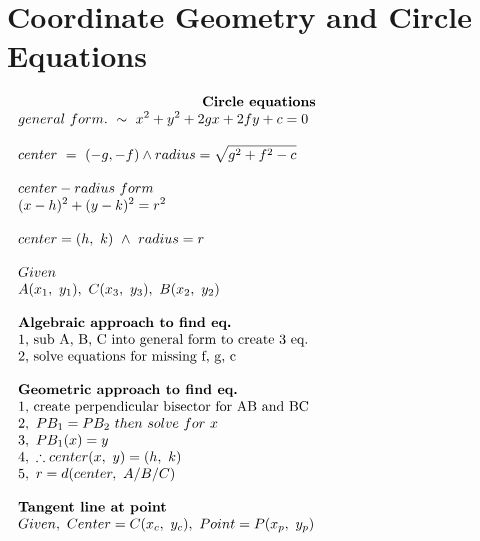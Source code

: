 \documentclass{article}
\begin{document}
\newpage 

\section{Coordinate Geometry and Circle Equations}

\setlength{\columnsep}{3cm}
\begin{multicols}{2}
    \noindent 
    \[
        \\
        \\
    \begin{array}{>{\displaystyle}l}
        \centerline{$\textbf{Circle\ equations}$}\\
        general\ form.\ \sim \ x^{2} +y^{2} +2gx+2fy+c=0\\
        \\
        center\ =\ ( -g,-f) \land radius=\sqrt{g^{2} +f^{2} -c} \ \\
        \\
        center-radius\ form\\
        ( x-h)^{2} +( y-k)^{2} =r^{2}\\
        \\
        center=( h,\ k) \ \land \ radius=r\\
        \\
        Given\\
        A( x_{1} ,\ y_{1}),\ C( x_{3} ,\ y_{3}),\ B( x_{2} ,\ y_{2})\\
        \\
        \textbf{Algebraic\ approach\ to\ find\ eq.} \\
        \text{1,\ sub\ A,\ B,\ C\ into\ general\ form\ to\ create\ 3\ eq.} \\
        \text{2,\ solve\ equations\ for\ missing\ f,\ g,\ c} \\
        \\
        \textbf{Geometric\ approach\ to\ find\ eq.} \\
        \text{1,\ create\ perpendicular\ bisector\ for\ AB\ and\ BC} \\
        2,\ PB_{1} =PB_{2} \ then\ solve\ for\ x\\
        3,\ PB_{1}( x) =y\\
        4,\ \therefore center( x,\ y) =( h,\ k)\\
        5,\ r=d( center,\ A/B/C)\\
        \\
        \textbf{Tangent line at point}\ \\
        Given,\ Center=C( x_{c} ,\ y_{c}) ,\ Point=P( x_{p} ,\ y_{p})\\

\end{array}\]
\end{multicols}
\end{document}
